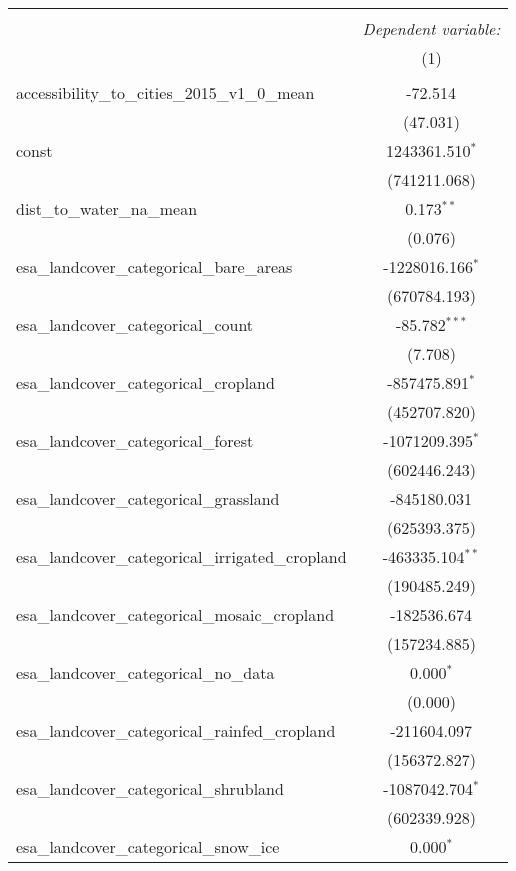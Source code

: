 \begin{table}[!htbp] \centering
\begin{tabular}{@{\extracolsep{5pt}}lc}
\\[-1.8ex]\hline
\hline \\[-1.8ex]
& \multicolumn{1}{c}{\textit{Dependent variable:}} \
\cr \cline{1-2}
\\[-1.8ex] & (1) \\
\hline \\[-1.8ex]
 accessibility_to_cities_2015_v1_0_mean & -72.514$^{}$ \\
  & (47.031) \\
 const & 1243361.510$^{*}$ \\
  & (741211.068) \\
 dist_to_water_na_mean & 0.173$^{**}$ \\
  & (0.076) \\
 esa_landcover_categorical_bare_areas & -1228016.166$^{*}$ \\
  & (670784.193) \\
 esa_landcover_categorical_count & -85.782$^{***}$ \\
  & (7.708) \\
 esa_landcover_categorical_cropland & -857475.891$^{*}$ \\
  & (452707.820) \\
 esa_landcover_categorical_forest & -1071209.395$^{*}$ \\
  & (602446.243) \\
 esa_landcover_categorical_grassland & -845180.031$^{}$ \\
  & (625393.375) \\
 esa_landcover_categorical_irrigated_cropland & -463335.104$^{**}$ \\
  & (190485.249) \\
 esa_landcover_categorical_mosaic_cropland & -182536.674$^{}$ \\
  & (157234.885) \\
 esa_landcover_categorical_no_data & 0.000$^{*}$ \\
  & (0.000) \\
 esa_landcover_categorical_rainfed_cropland & -211604.097$^{}$ \\
  & (156372.827) \\
 esa_landcover_categorical_shrubland & -1087042.704$^{*}$ \\
  & (602339.928) \\
 esa_landcover_categorical_snow_ice & 0.000$^{*}$ \\

\end{tabular}
\end{table}
